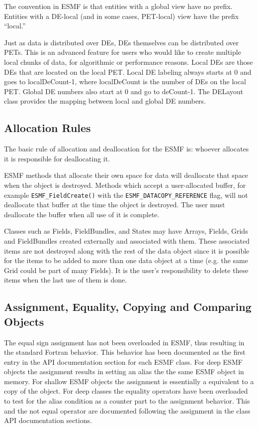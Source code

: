 The convention in ESMF is that entities with a global view
have no prefix.  Entities with a DE-local (and in some cases,
PET-local) view have the prefix ``local.''

Just as data is distributed over DEs, DEs themselves can be
distributed over PETs.  This is an advanced feature for users
who would like to create multiple local chunks of data, for
algorithmic or performance reasons.
Local DEs are those DEs that are located on the local PET.
Local DE labeling always starts at 0 and goes to localDeCount-1,
where localDeCount is the number of DEs on the local PET.
Global DE numbers also start at 0 and go to deCount-1.
The DELayout class provides the mapping between local
and global DE numbers. 

\subsection{Allocation Rules}

The basic rule of allocation and deallocation for the ESMF is:
whoever allocates it is responsible for deallocating it.

\begin{sloppypar}
ESMF methods that allocate their own space for data will
deallocate that space when the object is destroyed. 
Methods which accept a user-allocated buffer, for example
{\tt ESMF\_FieldCreate()} with the {\tt ESMF\_DATACOPY\_REFERENCE} flag,
will not deallocate that buffer at the time the object is
destroyed.  The user must deallocate the buffer
when all use of it is complete.
\end{sloppypar}

Classes such as Fields, FieldBundles, and States may have Arrays, 
Fields, Grids and FieldBundles created externally and associated with
them.  These associated items are not destroyed along with the rest  
of the data object since it is possible for the items to be added 
to more than one data object at a time (e.g. the same Grid could 
be part of many Fields).  It is the user's responsibility to delete 
these items when the last use of them is done.

\subsection{Assignment, Equality, Copying and Comparing Objects}
\label{assignment_equality_copy_compare}
The equal sign assignment has not been overloaded in ESMF, thus resulting in
the standard Fortran behavior. This behavior has been documented as the first
entry in the API documentation section for each ESMF class. For deep ESMF
objects the assignment results in setting an alias the the same ESMF object
in memory. For shallow ESMF objects the assignment is essentially a equivalent
to a copy of the object. For deep classes the equality operators have been
overloaded to test for the alias condition as a counter part to the assignment
behavior. This and the not equal operator are documented following the
assignment in the class API documentation sections. 

